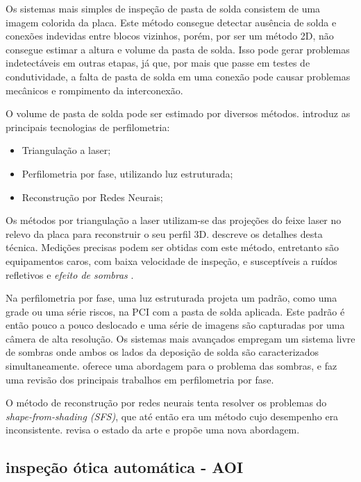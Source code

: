 Os sistemas mais simples de inspeção de pasta de solda consistem de uma imagem colorida da placa. Este método consegue detectar ausência de solda e conexões indevidas entre blocos vizinhos, porém, por ser um método 2D, não consegue estimar a altura e volume da pasta de solda. Isso pode gerar problemas indetectáveis em outras etapas, já que, por mais que passe em testes de condutividade, a falta de pasta de solda em uma conexão pode causar problemas mecânicos e rompimento da interconexão. 

O volume de pasta de solda pode ser estimado por diversos métodos. \citet{5246351} introduz as principais tecnologias de perfilometria: 
\begin{itemize}
    \item Triangulação a laser;
    \item Perfilometria por fase, utilizando luz estruturada;
    \item Reconstrução por Redes Neurais;
\end{itemize}

Os métodos por triangulação a laser utilizam-se das projeções do feixe laser no relevo da placa para reconstruir o seu perfil 3D.  \cite{5576321} descreve os detalhes desta técnica. Medições precisas podem ser obtidas com este método, entretanto são equipamentos caros, com baixa velocidade de inspeção, e susceptíveis a ruídos refletivos e \textit{efeito de sombras} \citep{5246351}.

Na perfilometria por fase, uma luz estruturada projeta um padrão, como uma grade ou uma série riscos, na PCI com a pasta de solda aplicada. Este padrão é então pouco a pouco deslocado e uma série de imagens são capturadas por uma câmera de alta resolução. Os sistemas mais avançados empregam um sistema livre de sombras onde ambos os lados da deposição de solda são caracterizados simultaneamente. \cite{5576321} oferece uma abordagem para o problema das sombras, e \cite{5246351} faz uma revisão dos principais trabalhos em perfilometria por fase.

O método de reconstrução por redes neurais tenta resolver os problemas do \textit{shape-from-shading (SFS)}, que até então era um método cujo desempenho era inconsistente. \cite{5246351} revisa o estado da arte e propõe uma nova abordagem.


\subsection{inspeção ótica automática - AOI}


